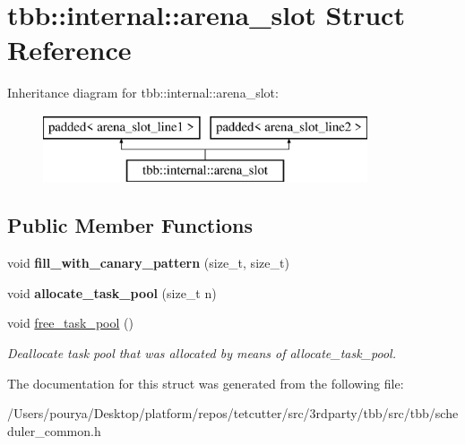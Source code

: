 \hypertarget{structtbb_1_1internal_1_1arena__slot}{}\section{tbb\+:\+:internal\+:\+:arena\+\_\+slot Struct Reference}
\label{structtbb_1_1internal_1_1arena__slot}
Inheritance diagram for tbb\+:\+:internal\+:\+:arena\+\_\+slot\+:\begin{figure}[H]
\begin{center}
\leavevmode
\includegraphics[height=2.000000cm]{structtbb_1_1internal_1_1arena__slot}
\end{center}
\end{figure}
\subsection*{Public Member Functions}
\begin{DoxyCompactItemize}
\item 
\hypertarget{structtbb_1_1internal_1_1arena__slot_a738e7bf1cdd82b4d174947bbc746c766}{}void {\bfseries fill\+\_\+with\+\_\+canary\+\_\+pattern} (size\+\_\+t, size\+\_\+t)\label{structtbb_1_1internal_1_1arena__slot_a738e7bf1cdd82b4d174947bbc746c766}

\item 
\hypertarget{structtbb_1_1internal_1_1arena__slot_a68ed52221d5eff32c230ccaf7a79fff7}{}void {\bfseries allocate\+\_\+task\+\_\+pool} (size\+\_\+t n)\label{structtbb_1_1internal_1_1arena__slot_a68ed52221d5eff32c230ccaf7a79fff7}

\item 
\hypertarget{structtbb_1_1internal_1_1arena__slot_ac1bad47da2fdc04592a7bb688bce676a}{}void \hyperlink{structtbb_1_1internal_1_1arena__slot_ac1bad47da2fdc04592a7bb688bce676a}{free\+\_\+task\+\_\+pool} ()\label{structtbb_1_1internal_1_1arena__slot_ac1bad47da2fdc04592a7bb688bce676a}

\begin{DoxyCompactList}\small\item\em Deallocate task pool that was allocated by means of allocate\+\_\+task\+\_\+pool. \end{DoxyCompactList}\end{DoxyCompactItemize}


The documentation for this struct was generated from the following file\+:\begin{DoxyCompactItemize}
\item 
/\+Users/pourya/\+Desktop/platform/repos/tetcutter/src/3rdparty/tbb/src/tbb/scheduler\+\_\+common.\+h\end{DoxyCompactItemize}
